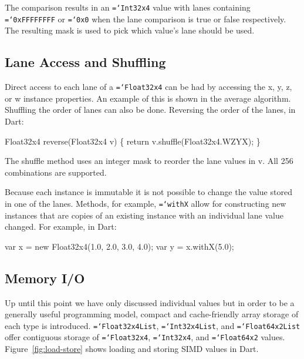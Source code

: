 \documentclass[preprint]{sigplanconf}
\newcommand{\ttt}[1]{{\texttt{\hyphenchar\font=`\-\relax #1}}}%
\begin{document}
The comparison results in an \ttt{Int32x4} value with lanes containing
\ttt{0xFFFFFFFF} or \ttt{0x0} when the lane comparison is true or false
respectively. The resulting mask is used to pick which value's lane should be
used.

\subsection{Lane Access and Shuffling}

Direct access to each lane of a \ttt{Float32x4} can be had by accessing the x,
y, z, or w instance properties. An example of this is shown in the average
algorithm. Shuffling the order of lanes can also be done. Reversing the order of
the lanes, in Dart:

\begin{small}
\begin{program}[style=tt]
Fl\tab{}oat32x4 reverse(Float32x4 v) \{
  return v.shuffle(Float32x4.WZYX);\untab{}
\}
\end{program}
\end{small}

The shuffle method uses an integer mask to reorder the lane values in v. All 256
combinations are supported.

Because each instance is immutable it is not possible to change the value stored
in one of the lanes. Methods, for example, \ttt{withX} allow for constructing
new instances that are copies of an existing instance with an individual lane
value changed. For example, in Dart:

\begin{small}
\begin{program}[style=tt]
var x = new Float32x4(1.0, 2.0, 3.0, 4.0);
var y = x.withX(5.0);
\end{program}
\end{small}

\subsection{Memory I/O}

Up until this point we have only discussed individual values but in order to be
a generally useful programming model, compact and cache-friendly array storage
of each type is introduced. \ttt{Float32x4List}, \ttt{Int32x4List}, and
\ttt{Float64x2List} offer contiguous storage of \ttt{Float32x4}, \ttt{Int32x4},
and \ttt{Float64x2} values. Figure~\ref{fig:load-store} shows loading and
storing SIMD values in Dart.
\end{document}
